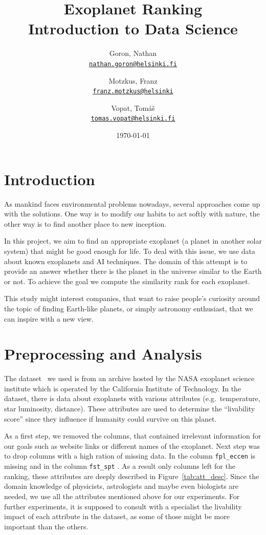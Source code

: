 \documentclass[12p]{article}
\title{Exoplanet Ranking \\\large Introduction to Data Science}
\date{\today}
\author{
    Goron, Nathan \\ \texttt{\href{mailto:nathan.goron@helsinki.fi}{nathan.goron@helsinki.fi}}
    \and 
    Motzkus, Franz \\ \texttt{\href{mailto:franz.motzkus@helsinki.fi}{franz.motzkus@helsinki}}
    \and 
    Vopat, Tomáš  \\ \texttt{\href{mailto:tomas.vopat@helsinki.fi}{tomas.vopat@helsinki.fi}}
}
\begin{document}
\maketitle

\section{Introduction}

As mankind faces environmental problems nowadays, several approaches come up with the solutions. One way is to modify our habits to act softly with nature, the other way is to find another place to new inception.

In this project, we aim to find an appropriate exoplanet (a planet in another solar system) that might be good enough for life. To deal with this issue, we use data about known exoplanets and AI techniques. The domain of this attempt is to provide an answer whether there is the planet in the universe similar to the Earth or not. To achieve the goal we compute the similarity rank for each exoplanet.

This study might interest companies, that want to raise people's curiosity around the topic of finding Earth-like planets, or simply astronomy enthusiast, that we can inspire with a new view.


\section{Preprocessing and Analysis}
The dataset~\cite{dataset} we used is from an archive hosted by the NASA exoplanet science institute which is operated by the California Institute of Technology. In the dataset, there is data about  exoplanets with  various attributes (e.g.\ temperature, star luminosity, distance). These attributes are used to determine the ``livability score'' since they influence if humanity could survive on this planet.

As a first step, we removed the columns, that contained irrelevant information for our goals such as website links or different names of the exoplanet. Next step was to drop columns with a high ration of missing data. In the column \verb|fpl_eccen| is  missing and in the column \verb|fst_spt| . As a result only  columns left for the ranking, these attributes are deeply described in Figure~\ref{tab:att_desc}. Since the domain knowledge of physicists, astrologists and maybe even biologists are needed, we use all the attributes mentioned above for our experiments. For further experiments, it is supposed to consult with a specialist the livability impact of each attribute in the dataset, as some of those might be more important than the others.
\end{document}
